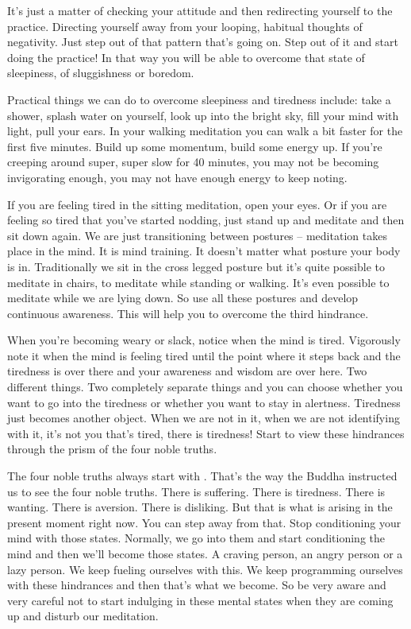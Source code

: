 \documentclass[letterpaper,10pt,english]{sphinxmanual}
\begin{document}
\sphinxAtStartPar
It’s just a matter of checking your attitude and then redirecting yourself  to  the  practice.  Directing  yourself  away  from  your  looping,  habitual
thoughts of negativity. Just step out of that pattern that’s going on. Step out
of it and start doing the practice! In that way you will be able to overcome
that state of sleepiness, of sluggishness or boredom.

\sphinxAtStartPar
Practical  things  we  can  do  to  overcome  sleepiness  and  tiredness
include: take a shower, splash water on yourself, look up into the bright sky,
fill your mind with light, pull your ears. In your walking meditation you can
walk a bit faster for the first five minutes. Build up some momentum, build
some energy up. If you’re creeping around super, super slow for 40 minutes,
you may not be becoming invigorating enough, you may not have enough
energy to keep noting.

\sphinxAtStartPar
If you are feeling tired in the sitting meditation, open your eyes. Or if
you are feeling so tired that you’ve started nodding, just stand up and meditate and then sit down again. We are just transitioning between postures –
meditation takes place in the mind. It is mind training. It doesn’t matter what
posture your body is in. Traditionally we sit in the cross legged posture but
it’s quite possible to meditate in chairs, to meditate while standing or walking. It’s even possible to meditate while we are lying down. So use all these
postures and develop continuous awareness. This will help you to overcome
the third hindrance.

\sphinxAtStartPar
When you’re becoming weary or slack, notice when the mind is tired.
Vigorously  note  it  when  the  mind  is  feeling  tired  until  the  point  where  it
steps back and the tiredness is over there and your awareness and wisdom
are over here. Two different things. Two completely separate things and you
can choose whether you want to go into the tiredness or whether you want
to stay in alertness. Tiredness just becomes another object. When we are not
  in it, when we are not identifying with it, it’s not you that’s tired, there is
tiredness! Start to view these hindrances through the prism of the four noble
truths.

\sphinxAtStartPar
The  four  noble  truths  always  start  with
.  That’s  the  way
the  Buddha  instructed  us  to  see  the  four  noble  truths.  There  is  suffering.
There is tiredness. There is wanting. There is aversion. There is disliking.
But that is what is arising in the present moment right now.
You can step away from that. Stop conditioning your mind with those states.
Normally, we go into them and start conditioning the mind and then we’ll
become  those  states. A  craving  person,  an  angry  person  or  a  lazy  person.
We keep fueling ourselves with this. We keep programming ourselves with
these hindrances and then that’s what we become. So be very aware and very
careful not to start indulging in these mental states when they are coming up
and disturb our meditation.
\end{document}
